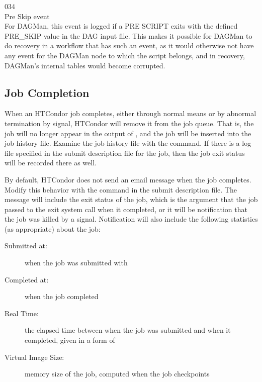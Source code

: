 \noindent{} 034 \\
 Pre Skip event \\
 For DAGMan, this event is logged
if a PRE SCRIPT exits with the defined PRE\_SKIP value in the DAG input file.
This makes it possible for DAGMan to do recovery in a workflow that has
such an event, 
as it would otherwise not have any event for the DAGMan node to
which the script belongs, 
and in recovery, DAGMan's internal tables would become corrupted.

\subsection{\label{sec:job-completion}Job Completion}

When an HTCondor job completes,
either through normal means or by abnormal termination by signal,
HTCondor will remove it from the job queue.
That is,
the job will no longer appear in the output of ,
and the job will be inserted into the job history file.
Examine the job history file with the  command. 
If there is a log file specified in the submit description file for the job, 
then the job exit status will be recorded there as well.

By default, HTCondor does not send an email message when the job completes.
Modify this behavior with the
 command in the submit description file.
The message will include the exit status of the job,
which is the argument that the job passed to the exit system call 
when it completed,
or it will be notification that the job was killed by a signal.  
Notification will also
include the following statistics (as appropriate) about the job:

\begin{description}

\item[Submitted at:] when the job was submitted with 

\item[Completed at:] when the job completed

\item[Real Time:] the elapsed time between when the job was submitted and
when it completed, given in a form of 

\item[Virtual Image Size:] memory size of the job, computed when the
job checkpoints

\end{description}

